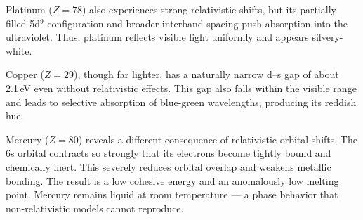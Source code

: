 \begin{figure}[h]
\centering
{}
\end{figure}

Platinum ($Z = 78$) also experiences strong relativistic shifts, but its partially filled 5d$^9$ configuration and broader interband spacing push absorption into the ultraviolet. Thus, platinum reflects visible light uniformly and appears silvery-white.

Copper ($Z = 29$), though far lighter, has a naturally narrow d–s gap of about 2.1 eV even without relativistic effects. This gap also falls within the visible range and leads to selective absorption of blue-green wavelengths, producing its reddish hue.

Mercury ($Z = 80$) reveals a different consequence of relativistic orbital shifts. The 6s orbital contracts so strongly that its electrons become tightly bound and chemically inert. This severely reduces orbital overlap and weakens metallic bonding. The result is a low cohesive energy and an anomalously low melting point. Mercury remains liquid at room temperature — a phase behavior that non-relativistic models cannot reproduce.

